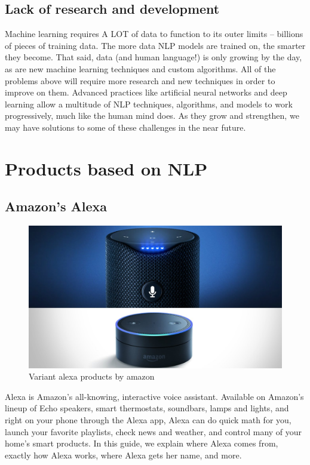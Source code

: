 \documentclass[11pt]{article}
\begin{document}
\subsection{Lack of research and development}
\label{sec:org8b6e6f7}
Machine learning requires A LOT of data to function to its outer limits – billions
of pieces of training data. The more data NLP models are trained on, the smarter
they become. That said, data (and human language!) is only growing by the day, as
are new machine learning techniques and custom algorithms. All of the problems above
will require more research and new techniques in order to improve on them.
Advanced practices like artificial neural networks and deep learning allow a multitude
of NLP techniques, algorithms, and models to work progressively, much like the human
mind does. As they grow and strengthen, we may have solutions to some of these
challenges in the near future.
\clearpage

\section{Products based on NLP}
\label{sec:org049b9ac}
\subsection{Amazon's Alexa}
\label{sec:org709522f}
\begin{figure}[htbp]
\centering
\includegraphics[width=.9\linewidth]{./img/alexa.png}
\caption{\label{fig:org13d0dc7}Variant alexa products by amazon}
\end{figure}
Alexa is Amazon’s all-knowing, interactive voice assistant. Available on Amazon’s
lineup of Echo speakers, smart thermostats, soundbars, lamps and lights, and right
on your phone through the Alexa app, Alexa can do quick math for you, launch your
favorite playlists, check news and weather, and control many of your home’s smart products.
In this guide, we explain where Alexa comes from, exactly how Alexa works, where
Alexa gets her name, and more.
\end{document}
